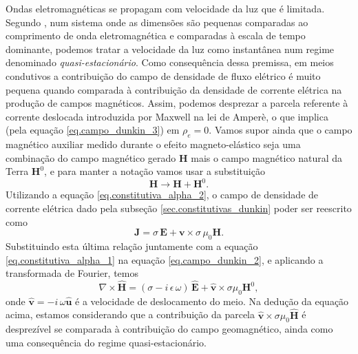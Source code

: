 Ondas eletromagn\'eticas se propagam com velocidade da luz que \'e limitada. Segundo \cite{jackson_classical_1999}, num sistema onde as dimens\~oes s\~ao pequenas comparadas ao comprimento de onda eletromagn\'etica e comparadas \`a escala de tempo dominante, podemos tratar a velocidade da luz como instant\^anea num regime denominado \textit{quasi-estacion\'ario}. Como consequ\^encia dessa premissa, em meios condutivos a contribui\c{c}\~ao do campo de densidade de fluxo el\'etrico \'e muito pequena quando comparada \`a contribui\c{c}\~ao da densidade de corrente el\'etrica na produ\c{c}\~ao de campos magn\'eticos. Assim, podemos desprezar a parcela referente \`a corrente deslocada introduzida por Maxwell na lei de Amper\`e, o que implica (pela equa\c{c}\~ao \ref{eq.campo_dunkin_3}) em $\rho_e=0$. 
Vamos supor ainda que o campo magn\'etico auxiliar medido durante o efeito magneto-el\'astico seja uma combina\c{c}\~ao do campo magn\'etico gerado $\mathbf{H}$ mais o campo magn\'etico natural da Terra $\mathbf{H}^0$, e para manter a nota\c{c}\~ao vamos usar a substitui\c{c}\~ao 
\begin{equation}
\mathbf{H}\longrightarrow\mathbf{H}+\mathbf{H}^0.
\end{equation}
Utilizando a equa\c{c}\~ao \ref{eq.constitutiva_alpha_2}, o campo de densidade de corrente el\'etrica dado pela subse\c{c}\~ao \ref{sec.constitutivas_dunkin} poder ser reescrito como
\begin{equation}
\mathbf{J}=\sigma\,\mathbf{E}+\mathbf{v}\times\sigma\,\mu_0\mathbf{H}.
\end{equation}
Substituindo esta \'ultima rela\c{c}\~ao juntamente com a equa\c{c}\~ao \ref{eq.constitutiva_alpha_1} na equa\c{c}\~ao \ref{eq.campo_dunkin_2}, e aplicando a transformada de Fourier, temos
\begin{equation}
\nabla\times\mathbf{\widehat{H}}=(\sigma-i\,\epsilon\,\omega)\,\mathbf{\widehat{E}}+\mathbf{\widehat{v}}\times\sigma\mu_0\mathbf{H}^0,
\end{equation}
onde $\mathbf{\widehat{v}}=-i\,\omega\mathbf{\widehat{u}}$ \'e a velocidade de deslocamento do meio. Na dedu\c{c}\~ao da equa\c{c}\~ao acima, estamos considerando que a contribui\c{c}\~ao da parcela $\mathbf{\widehat{v}}\times\sigma\mu_0\mathbf{\widehat{H}}$ \'e desprez\'ivel se comparada \`a contribui\c{c}\~ao do campo geomagn\'etico, ainda como uma consequ\^encia do regime quasi-estacion\'ario.

